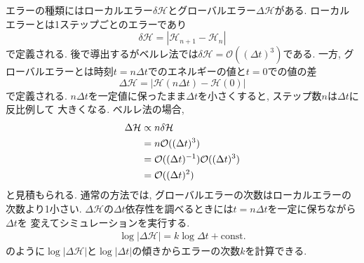 エラーの種類にはローカルエラー$\delta \mathcal{H}$とグローバルエラー$\Delta \mathcal{H}$がある.
ローカルエラーとは1ステップごとのエラーであり
\begin{equation}
 \delta \mathcal{H} = |\mathcal{H}_{n+1} - \mathcal{H}_{n}|
\end{equation}
で定義される. 
後で導出するがベルレ法では$\delta \mathcal{H} = \mathcal{O}((\Delta t)^{3})$である.
一方, グローバルエラーとは時刻$t = n \Delta t$でのエネルギーの値と$t=0$での値の差
\begin{equation}
 \Delta \mathcal{H} = |\mathcal{H}(n \Delta t) - \mathcal{H}(0)|
\end{equation}
で定義される.
$n \Delta t$を一定値に保ったまま$\Delta t$を小さくすると, ステップ数$n$は$\Delta t$に反比例して
大きくなる. ベルレ法の場合,
\begin{align}
  \Delta \mathcal{H} 
&\propto 
   n \delta \mathcal{H} \notag \\
&= n \mathcal{O} ((\Delta t)^{3}) \notag \\
&=   \mathcal{O} ((\Delta t)^{-1}) \mathcal{O} ((\Delta t)^{3}) \notag \\
&=   \mathcal{O} ((\Delta t)^{2}) \notag
\end{align}
と見積もられる. 
通常の方法では, グローバルエラーの次数はローカルエラーの次数より1小さい.
$\Delta \mathcal{H}$の$\Delta t$依存性を調べるときには$t = n\Delta t$を一定に保ちながら$\Delta t$を
変えてシミュレーションを実行する.
\begin{align}
 \log |\Delta \mathcal{H}| = k \log \Delta t + \mathrm{const.}
\end{align}
のように$\log |\Delta \mathcal{H}|$と$\log |\Delta t|$の傾きからエラーの次数$k$を計算できる.

